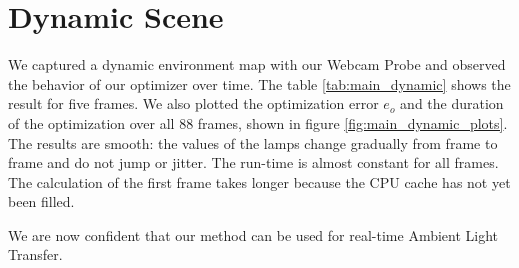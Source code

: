 %  

\section{Dynamic Scene}

 We captured a dynamic environment map with our Webcam Probe and observed the behavior of our optimizer over time.
 The table \ref{tab:main_dynamic} shows the result for five frames.
 We also plotted the optimization error $e_o$ and the duration of the optimization over all 88 frames, shown in figure \ref{fig:main_dynamic_plots}.
 The results are smooth: the values of the lamps change gradually from frame to frame and do not jump or jitter.
 The run-time is almost constant for all frames. The calculation of the first frame takes longer because the CPU cache has not yet been filled.
 
 We are now confident that our method can be used for real-time Ambient Light Transfer.


